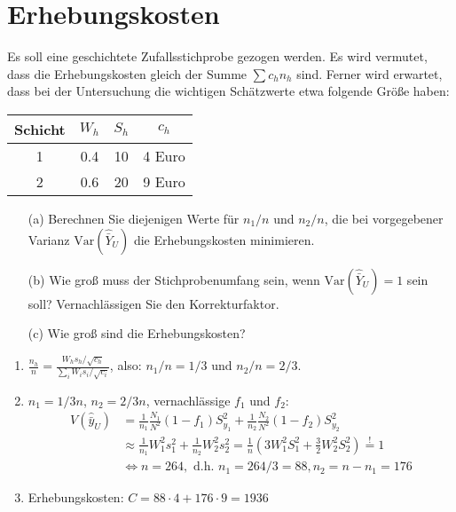 \documentclass{article}
\begin{document}
\section{Erhebungskosten}
Es soll eine geschichtete Zufallsstichprobe gezogen werden. Es wird vermutet, dass die Erhebungskosten gleich der
Summe $\sum c_h n_h$ sind. Ferner wird erwartet, dass bei der Untersuchung die wichtigen Schätzwerte etwa folgende Größe haben:
\begin{center}
	\begin{tabular}{cccc} \hline
		Schicht & $W_h$ & $S_h$ & $c_h$ \\ \hline
		1       & 0.4   & 10    & 4 Euro \\
		2       & 0.6   & 20    & 9 Euro \\ \hline
	\end{tabular}
\end{center}
\begin{enumerate}
	\item[(a)] Berechnen Sie diejenigen Werte für $n_1/n$ und $n_2/n$, die bei vorgegebener Varianz $\text{Var}(\hat{\bar Y}_U)$ die
	Erhebungskosten minimieren.
	\item[(b)] Wie groß muss der Stichprobenumfang sein, wenn $\text{Var}(\hat{\bar Y}_U) = 1$ sein soll?
	Vernachlässigen Sie den Korrekturfaktor.
	\item[(c)] Wie groß sind die Erhebungskosten?
\end{enumerate}
\begin{solution}
\begin{enumerate}
	\item $\frac{n_h}{n}=\frac{W_h s_h / \sqrt{c_h}}{\sum_i W_i s_i / \sqrt{c_i}}$, also: $n_1/n = 1/3$ und $n_2/n=2/3$.
	\item $n_1 = 1/3n$, $n_2=2/3 n$, vernachlässige $f_{1}$ und $f_2$:
	\begin{align*}
	V(\hat{\bar{y}}_U) &= \frac{1}{n_1}\frac{N_1}{N^2}(1-f_1)S_{y_1}^2 + \frac{1}{n_2}\frac{N_2}{N^2}(1-f_2)S_{y_2}^2\\
	&\approx \frac{1}{n_1}W_1^2 s_1^2 + \frac{1}{n_2}W_2^2 s_2^2 = \frac{1}{n}(3 W_1^2 S_1^2 + \frac{3}{2} W_2^2 S_2^2) \overset{!}{=} 1\\
	&\Leftrightarrow n =264, \text{ d.h. } n_1=264/3 = 88, n_2 = n-n_1 = 176
	\end{align*}
	\item Erhebungskosten: $C=88 \cdot 4 + 176 \cdot 9 = 1936$
\end{enumerate}

\end{solution}
\end{document}
